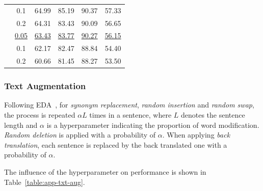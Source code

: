 \documentclass[letterpaper]{article} %
\begin{document}
\begin{table}[t]
\begin{center}
{\begin{tabular}{c!{\vrule}c!{\vrule}cccc}
& 0.1 & 64.99 & 85.19 & 90.37 & 57.33 \\
& 0.2 & 64.31 & 83.43 & 90.09 & 56.65 \\
\midrule
{} & \underline{0.05} & \underline{63.43} & \underline{83.77} & \underline{90.27} & \underline{56.15} \\
& 0.1 & 62.17 & 82.47 & 88.84 & 54.40 \\
& 0.2 & 60.66 & 81.45 & 88.27 & 53.50 \\
\bottomrule
\end{tabular}
}
\end{center}
\vspace{-0.5cm}
\end{table}

\subsubsection{Text Augmentation}
Following EDA~\cite{wei2019eda}, for \emph{synonym replacement}, \emph{random insertion} and \emph{random swap}, the process is repeated $\alpha L$ times in a sentence, where $L$ denotes the sentence length and $\alpha$ is a hyperparameter indicating the proportion of word modification. \emph{Random deletion} is applied with a probability of $\alpha$.
When applying \emph{back translation}, each sentence is replaced by the back translated one with a probability of $\alpha$.

The influence of the hyperparameter on performance is shown in Table~\ref{table:app-txt-aug}.



\end{document}
